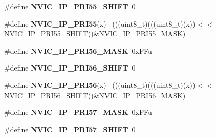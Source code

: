 \begin{DoxyCompactItemize}
\item 
\hypertarget{group___n_v_i_c___register___masks_ga43f444070cece069574415a8b1bf2a34}{}\#define {\bfseries N\+V\+I\+C\+\_\+\+I\+P\+\_\+\+P\+R\+I55\+\_\+\+S\+H\+I\+F\+T}~0\label{group___n_v_i_c___register___masks_ga43f444070cece069574415a8b1bf2a34}

\item 
\hypertarget{group___n_v_i_c___register___masks_gac627266239639c768cfef49fa0638092}{}\#define {\bfseries N\+V\+I\+C\+\_\+\+I\+P\+\_\+\+P\+R\+I55}(x)                                              ~(((uint8\+\_\+t)(((uint8\+\_\+t)(x))$<$$<$N\+V\+I\+C\+\_\+\+I\+P\+\_\+\+P\+R\+I55\+\_\+\+S\+H\+I\+F\+T))\&N\+V\+I\+C\+\_\+\+I\+P\+\_\+\+P\+R\+I55\+\_\+\+M\+A\+S\+K)\label{group___n_v_i_c___register___masks_gac627266239639c768cfef49fa0638092}

\item 
\hypertarget{group___n_v_i_c___register___masks_ga686ae462e1ec7fa96b42a2c699450df2}{}\#define {\bfseries N\+V\+I\+C\+\_\+\+I\+P\+\_\+\+P\+R\+I56\+\_\+\+M\+A\+S\+K}~0x\+F\+Fu\label{group___n_v_i_c___register___masks_ga686ae462e1ec7fa96b42a2c699450df2}

\item 
\hypertarget{group___n_v_i_c___register___masks_gacf82aab97150f28d3655e4d243ed7848}{}\#define {\bfseries N\+V\+I\+C\+\_\+\+I\+P\+\_\+\+P\+R\+I56\+\_\+\+S\+H\+I\+F\+T}~0\label{group___n_v_i_c___register___masks_gacf82aab97150f28d3655e4d243ed7848}

\item 
\hypertarget{group___n_v_i_c___register___masks_ga9ba5f395283cfa74aeae732eacc24098}{}\#define {\bfseries N\+V\+I\+C\+\_\+\+I\+P\+\_\+\+P\+R\+I56}(x)                                              ~(((uint8\+\_\+t)(((uint8\+\_\+t)(x))$<$$<$N\+V\+I\+C\+\_\+\+I\+P\+\_\+\+P\+R\+I56\+\_\+\+S\+H\+I\+F\+T))\&N\+V\+I\+C\+\_\+\+I\+P\+\_\+\+P\+R\+I56\+\_\+\+M\+A\+S\+K)\label{group___n_v_i_c___register___masks_ga9ba5f395283cfa74aeae732eacc24098}

\item 
\hypertarget{group___n_v_i_c___register___masks_gad5e78fabd7e15eca1f45b57f3590554c}{}\#define {\bfseries N\+V\+I\+C\+\_\+\+I\+P\+\_\+\+P\+R\+I57\+\_\+\+M\+A\+S\+K}~0x\+F\+Fu\label{group___n_v_i_c___register___masks_gad5e78fabd7e15eca1f45b57f3590554c}

\item 
\hypertarget{group___n_v_i_c___register___masks_gafb5f790242f6f5580586943a7ce83010}{}\#define {\bfseries N\+V\+I\+C\+\_\+\+I\+P\+\_\+\+P\+R\+I57\+\_\+\+S\+H\+I\+F\+T}~0\label{group___n_v_i_c___register___masks_gafb5f790242f6f5580586943a7ce83010}


\end{DoxyCompactItemize}
